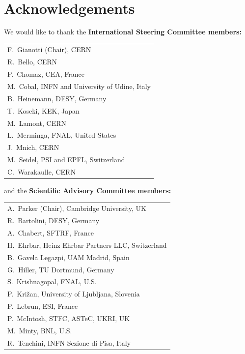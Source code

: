 \newpage

\section*{Acknowledgements}

We would like to thank the \textbf{International Steering Committee members:}\\


\vspace*{-3mm}


\begin{table}[!h]
	\small
	\centering
	\begin{tabular}{l}
		\toprule
		F.~Gianotti (Chair), CERN \\ 
		R.~Bello, CERN \\ 
		P.~Chomaz, CEA, France  \\ 
            M.~Cobal, INFN and University of Udine, Italy \\
		B.~Heinemann, DESY, Germany \\ 
		T.~Koseki, KEK, Japan \\ 
		M.~Lamont, CERN \\ 
		L.~Merminga, FNAL, United States \\ 
		J.~Mnich, CERN \\ 
		M.~Seidel, PSI and EPFL, Switzerland \\
		C.~Warakaulle, CERN \\
		\bottomrule
	\end{tabular}
\end{table}

\noindent and the \textbf{Scientific Advisory Committee members:}\\
\vspace*{-2mm}

\begin{table}[!h]
	\centering
	\small
	\vspace*{-3mm}
	\begin{tabular}{l}
		\toprule
		A.~Parker (Chair), Cambridge University, UK \\ 
		R.~Bartolini, DESY, Germany \\  
		A.~Chabert, SFTRF, France \\ 
		H.~Ehrbar, Heinz Ehrbar Partners LLC, Switzerland \\ 
		B.~Gavela Legazpi, UAM Madrid, Spain \\
		G.~Hiller, TU Dortmund, Germany \\
        S.~Krishnagopal, FNAL, U.S. \\		
        P.~Križan, University of Ljubljana, Slovenia\\
        P.~Lebrun, ESI, France\\
        P.~McIntosh, STFC, ASTeC,  UKRI, UK\\ 
        M.~Minty, BNL, U.S. \\  
        R.~Tenchini, INFN Sezione di Pisa, Italy  \\  
\bottomrule 
	\end{tabular}
\end{table}

